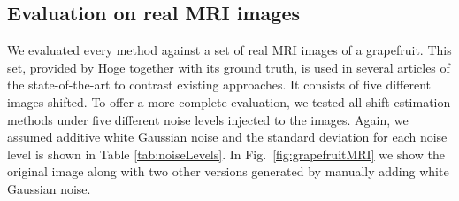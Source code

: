 \subsection{Evaluation on real MRI images}
\label{sec:realMRIChapter1}
We evaluated every method against a set of real MRI images of a grapefruit. This set, provided by Hoge \cite{Hoge_2003} together with its ground truth, is used in several articles of the state-of-the-art to contrast existing approaches. It consists of five different images shifted. To offer a more complete evaluation, we tested all shift estimation methods under  five different noise levels injected to the images. Again, we assumed additive white Gaussian noise and the standard deviation for each noise level is shown in Table \ref{tab:noiseLevels}. In Fig.~\ref{fig:grapefruitMRI} we show the original image along with two other versions generated by manually adding white Gaussian noise. 
